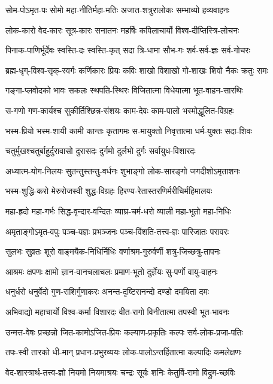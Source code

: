 \twolineshloka
{सोम-पोऽमृत-पः सोमो महा-नीतिर्महा-मतिः}
{अजात-शत्रुरालोकः सम्भाव्यो हव्यवाहनः}

\twolineshloka
{लोक-कारो वेद-कारः सूत्र-कारः सनातनः}
{महर्षिः कपिलाचार्यो विश्व-दीप्तिस्त्रि-लोचनः}

\twolineshloka
{पिनाक-पाणिर्भूर्देवः स्वस्ति-दः स्वस्ति-कृत् सदा}
{त्रि-धामा सौभ-गः शर्व-सर्व-ज्ञः सर्व-गोचरः}

\twolineshloka
{ब्रह्म-धृग्-विश्व-सृक्-स्वर्गः कर्णिकारः प्रियः कविः}
{शाखो विशाखो गो-शाखः शिवो नैकः क्रतुः समः}

\twolineshloka
{गङ्गा-प्लवोदको भावः सकलः स्थपति-स्थिरः}
{विजितात्मा विधेयात्मा भूत-वाहन-सारथिः}

\twolineshloka
{स-गणो गण-कार्यश्च सुकीर्तिश्छिन्न-संशयः}
{काम-देवः काम-पालो भस्मोद्धूलित-विग्रहः}

\twolineshloka
{भस्म-प्रियो भस्म-शायी कामी कान्तः कृतागमः}
{स-मायुक्तो निवृत्तात्मा धर्म-युक्तः सदा-शिवः}

\twolineshloka
{चतुर्मुखश्चतुर्बाहुर्दुरावासो दुरासदः}
{दुर्गमो दुर्लभो दुर्गः सर्वायुध-विशारदः}

\twolineshloka
{अध्यात्म-योग-निलयः सुतन्तुस्तन्तु-वर्धनः}
{शुभाङ्गो लोक-सारङ्गो जगदीशोऽमृताशनः}

\twolineshloka
{भस्म-शुद्धि-करो मेरुरोजस्वी शुद्ध-विग्रहः}
{हिरण्य-रेतास्तरणिर्मरीचिर्महिमालयः}

\twolineshloka
{महा-ह्रदो महा-गर्भः सिद्ध-वृन्दार-वन्दितः}
{व्याघ्र-चर्म-धरो व्याली महा-भूतो महा-निधिः}

\twolineshloka
{अमृताङ्गोऽमृत-वपुः पञ्च-यज्ञः प्रभञ्जनः}
{पञ्च-विंशति-तत्त्व-ज्ञः पारिजातः परावरः}

\twolineshloka
{सुलभः सुव्रतः शूरो वाङ्मयैक-निधिर्निधिः}
{वर्णाश्रम-गुरुर्वर्णी शत्रु-जिच्छत्रु-तापनः}

\twolineshloka
{आश्रमः क्षपणः क्षामो ज्ञान-वानचलाचलः}
{प्रमाण-भूतो दुर्ज्ञेयः सु-पर्णो वायु-वाहनः}

\twolineshloka
{धनुर्धरो धनुर्वेदो गुण-राशिर्गुणाकरः}
{अनन्त-दृष्टिरानन्दो दण्डो दमयिता दमः}

\twolineshloka
{अभिवाद्यो महाचार्यो विश्व-कर्मा विशारदः}
{वीत-रागो विनीतात्मा तपस्वी भूत-भावनः}

\twolineshloka
{उन्मत्त-वेषः प्रच्छन्नो जित-कामोऽजित-प्रियः}
{कल्याण-प्रकृतिः कल्पः सर्व-लोक-प्रजा-पतिः}

\twolineshloka
{तपः-स्वी तारको धी-मान् प्रधान-प्रभुरव्ययः}
{लोक-पालोऽन्तर्हितात्मा कल्पादिः कमलेक्षणः}

\twolineshloka
{वेद-शास्त्रार्थ-तत्त्व-ज्ञो नियमो नियमाश्रयः}
{चन्द्रः सूर्यः शनिः केतुर्वि-रामो विद्रुम-च्छविः}


